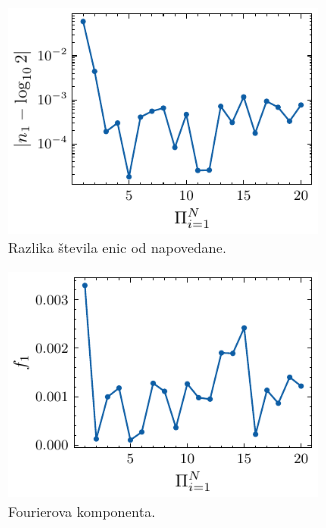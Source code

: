 \documentclass[11pt, oneside]{article}
\theoremstyle{definition}
\begin{document}
\newpage

\begin{figure}[h!]
    \centering
    \begin{subfigure}[b]{0.49\textwidth}
        \centering
        \includegraphics[width=0.9\textwidth]{reddit_times_n1.pdf}
        \caption{Razlika števila enic od napovedane.}
        \label{fig: rtimes1}
    \end{subfigure}
    \hfill
    \begin{subfigure}[b]{0.49\textwidth}
        \centering
        \includegraphics[width=0.9\textwidth]{reddit_times_f1.pdf}
        \caption{Fourierova komponenta.}
        \label{fig: rtimes2}
    \end{subfigure}
    \hfill
    \begin{subfigure}[b]{0.49\textwidth}
        \centering

\end{subfigure}
\end{figure}
\end{document}
